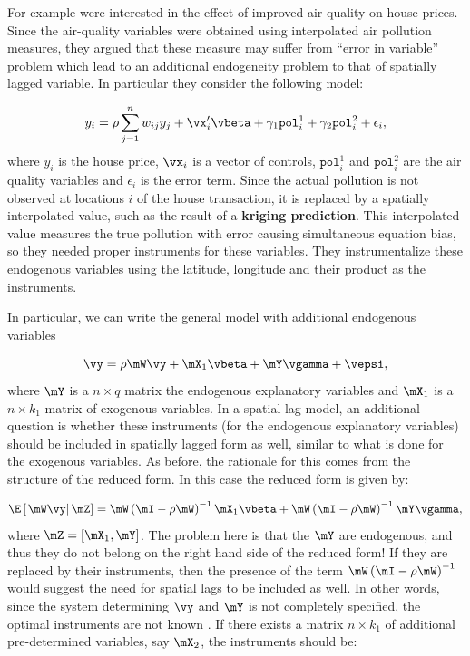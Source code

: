 \documentclass[english,12pt]{book}\usepackage[]{graphicx}\usepackage[]{xcolor}
\begin{document}
For example \cite{anselin2008errors} were interested in the effect of improved air quality on house prices. Since the air-quality variables were obtained using interpolated air pollution measures, they argued that these measure may suffer from ``error in variable'' problem which lead to an additional endogeneity problem to that of spatially lagged variable. In particular they consider the following model:

\begin{equation*}
  y_i = \rho \sum_{j = 1}^nw_{ij}y_j + \vx_i'\vbeta + \gamma_1\texttt{pol}_i^1 + \gamma_2\texttt{pol}_i^2 + \epsilon_i, 
\end{equation*}
%
where $y_i$ is the house price,  $\vx_i$ is a vector of controls,  $\texttt{pol}_i^1$ and $\texttt{pol}_i^2$ are the air quality variables and $\epsilon_i$ is the error term. Since the actual pollution is not observed at locations $i$ of the house transaction, it is replaced by a spatially interpolated value, such as the result of a \textbf{kriging prediction}. This interpolated value measures the true pollution with error causing simultaneous equation bias, so they needed proper instruments for these variables. They instrumentalize these endogenous variables using the latitude, longitude and their product as the instruments. 

In particular, we can write the general model with additional endogenous variables

\begin{equation*}
  \vy = \rho\mW\vy + \mX_1\vbeta + \mY\vgamma + \vepsi,
\end{equation*}
%
where $\mY$ is a $n\times q$ matrix the endogenous explanatory variables and $\mX_1$ is a $n\times k_1$ matrix of exogenous variables. In a spatial lag model, an additional question is whether these instruments (for the endogenous explanatory variables) should be included in spatially lagged form as well, similar to what is done for the exogenous variables. As before, the rationale for this comes from the structure of the reduced form.  In this case the reduced form is given by:


\begin{equation*}
\E\left[\left.\mW\vy\right|\mZ\right] = \mW\left(\mI - \rho\mW\right)^{-1}\mX_1\vbeta + \mW\left(\mI - \rho\mW\right)^{-1}\mY\vgamma,
\end{equation*}
%
where $\mZ = \left[\mX_1, \mY\right]$. The problem here is that the $\mY$ are endogenous, and thus they do not belong on the right hand side of the reduced form!  If they are replaced by their instruments, then the presence of the term $\mW\left(\mI - \rho\mW\right)^{-1}$ would suggest the need for spatial lags to be included as well. In other words, since the system determining $\vy$ and $\mY$ is not completely specified, the optimal instruments are not known \citep{spdep}. If there exists a matrix $n \times k_1$ of additional pre-determined variables, say $\mX_2$, the instruments should be:
\end{document}
